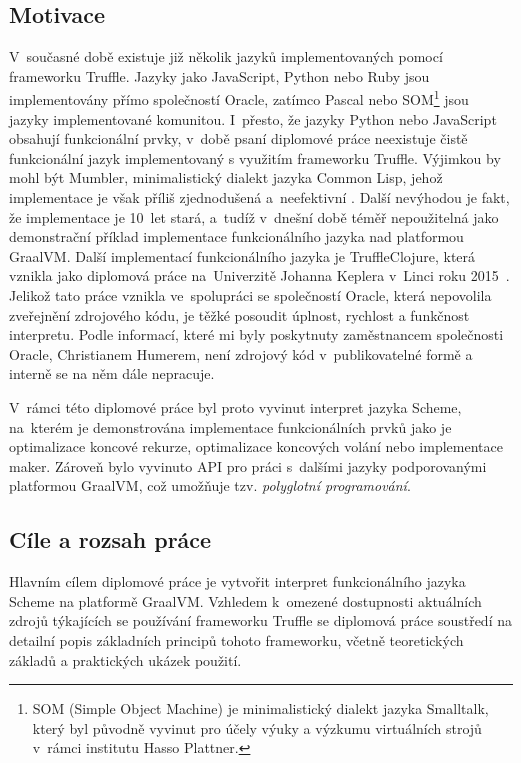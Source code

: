 \documentclass[
  master,
  biblatex,
  figures=true,
  theorems,
  sourcecodes,
  glossaries,
  index
]{kidiplom}
\begin{document}
\subsection{Motivace}
V~současné době existuje již několik jazyků implementovaných pomocí frameworku Truffle. Jazyky jako JavaScript, Python nebo Ruby jsou implementovány přímo společností Oracle, zatímco Pascal nebo SOM\footnote{SOM (Simple Object Machine) je minimalistický dialekt jazyka Smalltalk, který byl původně vyvinut pro účely výuky a výzkumu virtuálních strojů v~rámci institutu Hasso Plattner.} jsou jazyky implementované komunitou. I~přesto, že jazyky Python nebo JavaScript obsahují funkcionální prvky, v~době psaní diplomové práce neexistuje čistě funkcionální jazyk implementovaný s využitím frameworku Truffle. Výjimkou by mohl být Mumbler, minimalistický dialekt jazyka Common Lisp, jehož implementace je však příliš zjednodušená a~neefektivní \cite{mumbler}. Další nevýhodou je fakt, že implementace je 10~let stará, a~tudíž v~dnešní době téměř nepoužitelná jako demonstrační příklad implementace funkcionálního jazyka nad platformou GraalVM. Další implementací funkcionálního jazyka je TruffleClojure, která vznikla jako diplomová práce na~Univerzitě Johanna Keplera v~Linci roku 2015~\cite{truffle-clojure}. Jelikož tato práce vznikla ve~spolupráci se společností Oracle, která nepovolila zveřejnění zdrojového kódu, je těžké posoudit úplnost, rychlost a funkčnost interpretu. Podle informací, které mi byly poskytnuty zaměstnancem společnosti Oracle, Christianem Humerem, není zdrojový kód v~publikovatelné formě a interně se na něm dále nepracuje.   

V~rámci této diplomové práce byl proto vyvinut interpret jazyka Scheme, na~kterém je demonstrována implementace funkcionálních prvků jako je optimalizace koncové rekurze, optimalizace koncových volání nebo implementace maker. Zároveň bylo vyvinuto API pro práci s~dalšími jazyky podporovanými platformou GraalVM, což umožňuje tzv. \textit{polyglotní programování}.


\subsection{Cíle a rozsah práce}
Hlavním cílem diplomové práce je vytvořit interpret funkcionálního jazyka Scheme na platformě GraalVM. Vzhledem k~omezené dostupnosti aktuálních zdrojů týkajících se používání frameworku Truffle se diplomová práce soustředí na detailní popis základních principů tohoto frameworku, včetně teoretických základů a praktických ukázek použití.
\end{document}

